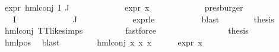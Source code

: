 \begin{isabellebody}
\ {\isachardoublequoteopen}expr{\isacharunderscore}{\kern0pt}{}\ {\isacharparenleft}{\kern0pt}hml{\isacharunderscore}{\kern0pt}conj\ I{\isacharprime}{\kern0pt}\ J{\isacharprime}{\kern0pt}\ {\isasymPhi}{\isacharprime}{\kern0pt}{\isacharparenright}{\kern0pt}\ {\isasymle}\ {}{\isachardoublequoteclose}\isanewline
\ \ \ \ \ \ \ \ \isamarkupfalse%
\ {\isacartoucheopen}expr{\isacharunderscore}{\kern0pt}{}\ x\ {\isasymle}\ {}{\isacartoucheclose}\ \isanewline
\ \ \ \ \ \ \ \ \isamarkupfalse%
\ presburger\isanewline
\ \ \ \ \ \ \isamarkupfalse%
\ {\isachardoublequoteopen}{\isacharparenleft}{\kern0pt}{\isasymPhi}{\isacharprime}{\kern0pt}\ {\isacharbackquote}{\kern0pt}\ I{\isacharprime}{\kern0pt}{\isacharparenright}{\kern0pt}\ {\isacharequal}{\kern0pt}\ {\isacharbraceleft}{\kern0pt}{\isacharbraceright}{\kern0pt}{\isachardoublequoteclose}\ \isanewline
\ \ \ \ \ \ \ \ {\isachardoublequoteopen}{\isacharparenleft}{\kern0pt}{\isasymPhi}{\isacharprime}{\kern0pt}\ {\isacharbackquote}{\kern0pt}\ J{\isacharprime}{\kern0pt}{\isacharparenright}{\kern0pt}\ {\isacharequal}{\kern0pt}\ {\isacharbraceleft}{\kern0pt}{\isacharbraceright}{\kern0pt}{\isachardoublequoteclose}\ \isanewline
\ \ \ \ \ \ \ \ \isamarkupfalse%
\ expr{\isacharunderscore}{\kern0pt}{}{\isacharunderscore}{\kern0pt}le{\isacharunderscore}{\kern0pt}{}\ \isanewline
\ \ \ \ \ \ \ \ \isamarkupfalse%
\ blast{\isacharplus}{\kern0pt}\isanewline
\ \ \ \ \ \ \isamarkupfalse%
\ {\isacharquery}{\kern0pt}thesis\ \isamarkupfalse%
\ hml{\isacharunderscore}{\kern0pt}conj\ TT{\isacharunderscore}{\kern0pt}like{\isachardot}{\kern0pt}simps\isanewline
\ \ \ \ \ \ \ \ \isamarkupfalse%
\ fastforce\isanewline
\ \ \ \ \isamarkupfalse%
\ \ \ \ \isanewline
\ \ \ \ \isamarkupfalse%
\ \isamarkupfalse%
\ {\isacharquery}{\kern0pt}thesis\isanewline
\ \ \ \ \ \ \isamarkupfalse%
\ hml{\isacharunderscore}{\kern0pt}pos\ \isamarkupfalse%
\ blast\isanewline
\ \ \isamarkupfalse%
\isanewline
\ \ \ \ \isamarkupfalse%
\ {\isacharparenleft}{\kern0pt}hml{\isacharunderscore}{\kern0pt}conj\ x{}{}\ x{}{}\ x{}{}{\isacharparenright}{\kern0pt}\isanewline
\ \ \ \ \isamarkupfalse%
\ {\isacartoucheopen}expr{\isacharunderscore}{\kern0pt}{}\ x\ {\isasymle}\ {}{\isacartoucheclose}\ \isamarkupfalse%

\end{isabellebody}
